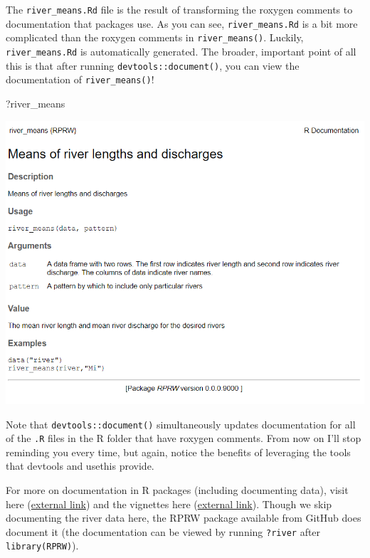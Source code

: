 \documentclass[
]{book}
\newenvironment{Shaded}{\begin{snugshade}}{\end{snugshade}}
\newcommand{\NormalTok}[1]{#1}
\begin{document}
The \texttt{river\_means.Rd} file is the result of transforming the roxygen comments to documentation that packages use. As you can see, \texttt{river\_means.Rd} is a bit more complicated than the roxygen comments in \texttt{river\_means()}. Luckily, \texttt{river\_means.Rd} is automatically generated. The broader, important point of all this is that after running \texttt{devtools::document()}, you can view the documentation of \texttt{river\_means()}!

\begin{Shaded}
\begin{Highlighting}[]
\NormalTok{?river_means}
\end{Highlighting}
\end{Shaded}

\includegraphics[width=1\linewidth]{images/newrpack_example}

Note that \texttt{devtools::document()} simultaneously updates documentation for all of the \texttt{.R} files in the R folder that have roxygen comments. From now on I'll stop reminding you every time, but again, notice the benefits of leveraging the tools that devtools and usethis provide.

For more on documentation in R packages (including documenting data), visit here (\href{https://r-pkgs.org/man.html\#man}{external link}) and the vignettes here (\href{https://cran.r-project.org/web/packages/roxygen2/index.html}{external link}). Though we skip documenting the river data here, the RPRW package available from GitHub does document it (the documentation can be viewed by running \texttt{?river} after \texttt{library(RPRW)}).
\end{document}
